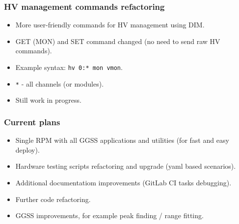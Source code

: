 \documentclass[10pt]{beamer}
\begin{document}
\begin{frame}
\frametitle{HV management commands refactoring}
\begin{itemize}
    \item More user-friendly commands for HV management using DIM.
    \item GET (MON) and SET command changed (no need to send raw HV commands).
    \item Example syntax: \lstinline{hv 0:* mon vmon}.
    \item \lstinline{*} - all channels (or modules).
    \item Still work in progress.
\end{itemize}
\end{frame}


\begin{frame}
\frametitle{Current plans}
\begin{itemize}
    \item Single RPM with all GGSS applications and utilities (for fast and easy deploy).
    \item Hardware testing scripts refactoring and upgrade (yaml based scenarios).
    \item Additional documentatiom improvements (GitLab CI tasks debugging).
    \item Further code refactoring.
    \item GGSS improvements, for example peak finding / range fitting.
\end{itemize}
\end{frame}
    
\end{document}
